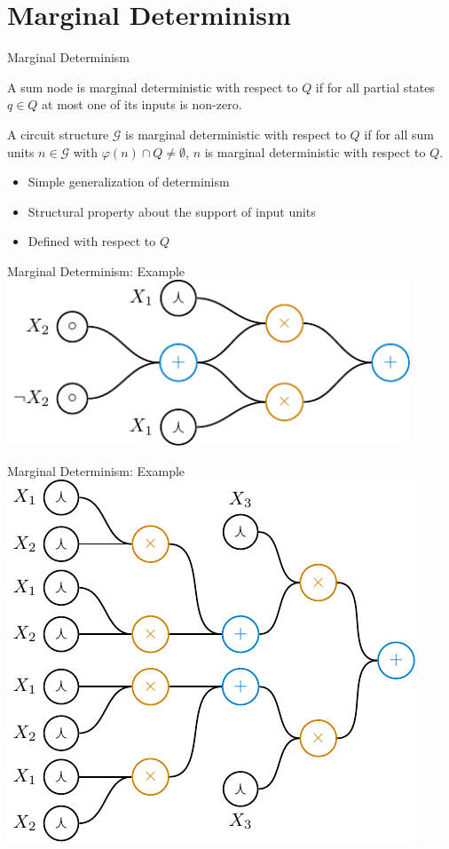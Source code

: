 \documentclass[aspectratio=169]{beamer}
\begin{document}
\section{Marginal Determinism}
  \begin{frame}{Marginal Determinism}
    \begin{mybox}
      A sum node is marginal deterministic with respect to $Q$ if for all partial states $q\in Q$ at most one of its inputs is non-zero.
    \end{mybox}
    \begin{mybox}
      A circuit structure $\mathscr{G}$ is marginal deterministic with respect to $Q$ if for all sum units $n\in\mathscr{G}$ with $φ(n)\cap Q\neq\emptyset$, $n$ is marginal deterministic with respect to $Q$.
    \end{mybox}
    \begin{itemize}
      \item Simple generalization of determinism
      \item Structural property about the support of input units
      \item Defined with respect to $Q$
    \end{itemize}
  \end{frame}

  \begin{frame}{Marginal Determinism: Example}
    \center
    \includegraphics[width=0.9\textwidth]{figures/example.pdf}
  \end{frame}
  \begin{frame}{Marginal Determinism: Example}
    \center
    \includegraphics[height=0.8\textheight]{figures/big-example.pdf}
  \end{frame}
\end{document}
